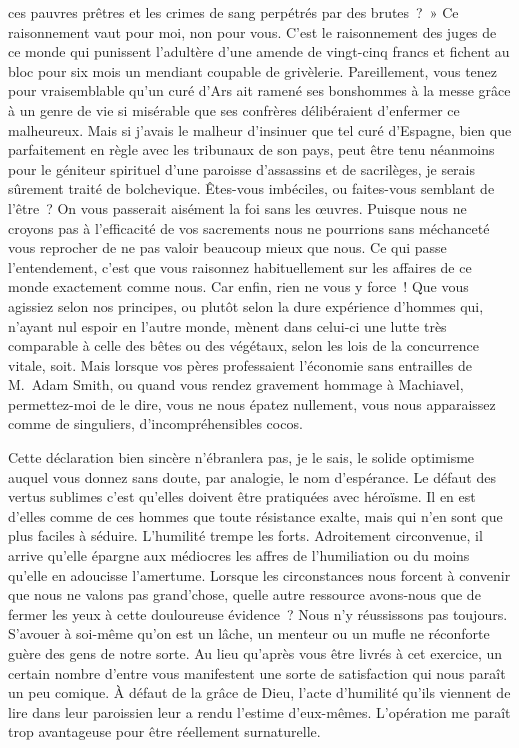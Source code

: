 \documentclass[french,twoside]{book} %
\begin{document}
ces pauvres prêtres et les crimes de sang perpétrés par des brutes ? » Ce raisonnement vaut pour moi, non pour vous. C’est le raisonnement des juges de ce monde qui punissent l’adultère d’une amende de vingt-cinq francs et fichent au bloc pour six mois un mendiant coupable de grivèlerie. Pareillement, vous tenez pour vraisemblable qu’un curé d’Ars ait ramené ses bonshommes à la messe grâce à un genre de vie si misérable que ses confrères délibéraient d’enfermer ce malheureux. Mais si j’avais le malheur d’insinuer que tel curé d’Espagne, bien que parfaitement en règle avec les tribunaux de son pays, peut être tenu néanmoins pour le géniteur spirituel d’une paroisse d’assassins et de sacrilèges, je serais sûrement traité de bolchevique. Êtes-vous imbéciles, ou faites-vous semblant de l’être ? On vous passerait aisément la foi sans les œuvres. Puisque nous ne croyons pas à l’efficacité de vos sacrements nous ne pourrions sans méchanceté vous reprocher de ne pas valoir beaucoup mieux que nous. Ce qui passe l’entendement, c’est que vous raisonnez habituellement sur les affaires de ce monde exactement comme nous. Car enfin, rien ne vous y force ! Que vous agissiez selon nos principes, ou plutôt selon la dure expérience d’hommes qui, n’ayant nul espoir en l’autre monde, mènent dans celui-ci une lutte très comparable à celle des bêtes ou des végétaux, selon les lois de la concurrence vitale, soit. Mais lorsque vos pères professaient l’économie sans entrailles de M. Adam Smith, ou quand vous rendez gravement hommage à Machiavel, permettez-moi de le dire, vous ne nous épatez nullement, vous nous apparaissez comme de singuliers, d’incompréhensibles cocos.\par
Cette déclaration bien sincère n’ébranlera pas, je le sais, le solide optimisme auquel vous donnez sans doute, par analogie, le nom d’espérance. Le défaut des vertus sublimes c’est qu’elles doivent être pratiquées avec héroïsme. Il en est d’elles comme de ces hommes que toute résistance exalte, mais qui n’en sont que plus faciles à séduire. L’humilité trempe les forts. Adroitement circonvenue, il arrive qu’elle épargne aux médiocres les affres de l’humiliation ou du moins qu’elle en adoucisse l’amertume. Lorsque les circonstances nous forcent à convenir que nous ne valons pas grand’chose, quelle autre ressource avons-nous que de fermer les yeux à cette douloureuse évidence ? Nous n’y réussissons pas toujours. S’avouer à soi-même qu’on est un lâche, un menteur ou un mufle ne réconforte guère des gens de notre sorte. Au lieu qu’après vous être livrés à cet exercice, un certain nombre d’entre vous manifestent une sorte de satisfaction qui nous paraît un peu comique. À défaut de la grâce de Dieu, l’acte d’humilité qu’ils viennent de lire dans leur paroissien leur a rendu l’estime d’eux-mêmes. L’opération me paraît trop avantageuse pour être réellement surnaturelle.\par
 \par
\end{document}
